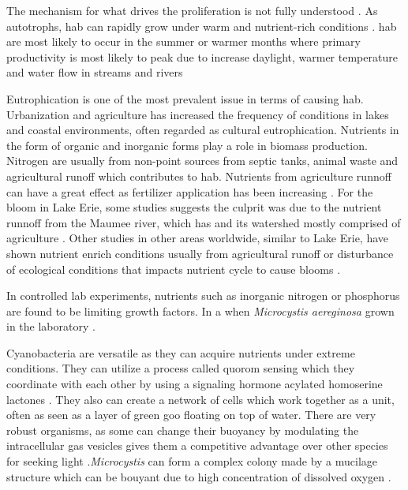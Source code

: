 The mechanism for what drives the proliferation is not fully understood \cite{dittmann_cyanobacterial_2012}. As autotrophs, \gls{hab} can rapidly grow under warm and nutrient-rich conditions \cite{rastogi_cyanotoxin-microcystins:_2014}. \gls{hab} are most likely to occur in the summer or warmer months where primary productivity is most likely to peak due to increase daylight, warmer temperature and water flow in streams and rivers \cite{vannote_river_1980,chapra_climate_2017-2}



Eutrophication is one of the most prevalent issue in terms of causing \gls{hab}. Urbanization and agriculture has increased the frequency of  conditions in lakes and coastal environments, often regarded as cultural eutrophication\cite{smith_eutrophication_2009}.
Nutrients in the form of organic and inorganic forms play a role in biomass production. Nitrogen are usually from non-point sources from  septic tanks, animal waste and agricultural runoff which contributes to \gls{hab}. Nutrients from agriculture runnoff can have a great effect as fertilizer application has been increasing \cite{anderson_harmful_2002}. For the bloom in Lake Erie,
some studies suggests the culprit was due to the nutrient runnoff from the  Maumee river, which has and its watershed mostly comprised of agriculture \cite{michalak_record-setting_2013, chaffin_accuracy_2018}. Other studies in other areas worldwide, similar to Lake Erie, have shown nutrient enrich conditions usually from agricultural runoff or disturbance of ecological conditions that impacts nutrient cycle to cause blooms \cite{ahn_evaluation_2011, ahn_rainfall_2002, anderson_harmful_2002, jiang_statistical_2008}.

In controlled lab experiments, nutrients such as inorganic nitrogen or phosphorus are found to be limiting growth factors. In a  when \emph{Microcystis aereginosa} grown in the laboratory \cite{xiao_colony_2018, yema_role_2016}.

Cyanobacteria are versatile as they can acquire nutrients under extreme conditions. They can utilize a process called quorom sensing which they coordinate with each other by using a signaling hormone acylated homoserine lactones \cite{van_mooy_quorum_2012}.
They also can create a network of cells which work together as a unit, often as seen as a layer of green goo floating on top of water.  There are very robust organisms, as some can change their buoyancy by modulating the intracellular gas vesicles gives them a competitive advantage over other species for seeking light \cite{feng_how_2018}.\emph{Microcystis} can form a complex colony made by a mucilage structure which can be bouyant due to high concentration of dissolved oxygen \cite{xiao_colony_2018}.


